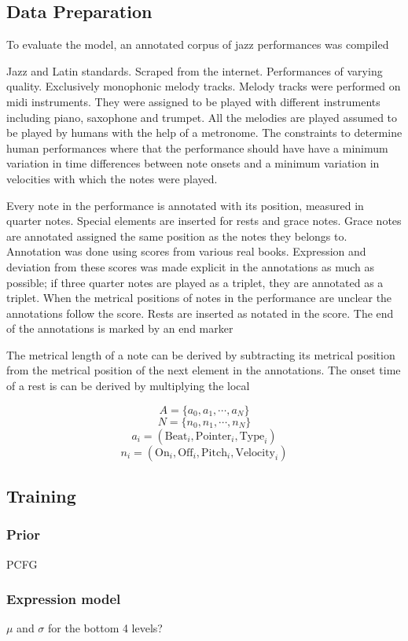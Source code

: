 

\subsection{Data Preparation}

To evaluate the model, an annotated corpus of jazz performances was compiled

Jazz and Latin standards. Scraped from the internet. Performances of varying quality. Exclusively monophonic melody tracks. Melody tracks were performed on midi instruments. They were assigned to be played with different instruments including piano, saxophone and trumpet. All the melodies are played assumed to be played by humans with the help of a metronome. The constraints to determine human performances where that the performance should have have a minimum variation in time differences between note onsets and a minimum variation in velocities with which the notes were played.

Every note in the performance is annotated with its position, measured in quarter notes. Special elements are inserted for rests and grace notes. Grace notes are annotated assigned the same position as the notes they belongs to. Annotation was done using scores from various real books. Expression and deviation from these scores was made explicit in the annotations as much as possible; if three quarter notes are played as a triplet, they are annotated as a triplet. When the metrical positions of notes in the performance are unclear the annotations follow the score. Rests are inserted as notated in the score. The end of the annotations is marked by an end marker

The metrical length of a note can be derived by subtracting its metrical position from the metrical position of the next element in the annotations. The onset time of a rest is can be derived by multiplying the local 

\[A = \{a_0, a_1, \cdots, a_N\}\]
\[N = \{n_0, n_1, \cdots, n_N\}\]
\[a_i = (\mathrm{Beat}_i, \mathrm{Pointer}_i, \mathrm{Type}_i)\]
\[n_i = (\mathrm{On}_i, \mathrm{Off}_i, \mathrm{Pitch}_i, \mathrm{Velocity}_i)\]

\subsection{Training}

\subsubsection{Prior}

PCFG

\subsubsection{Expression model}

$\mu$ and $\sigma$ for the bottom 4 levels?